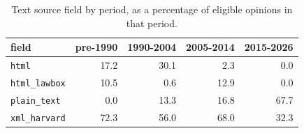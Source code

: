 \begin{table}[t]
\centering\small
\begin{tabular}{lrrrr}
\toprule
field & pre-1990 & 1990-2004 & 2005-2014 & 2015-2026  \\
\midrule
\texttt{html} & 17.2 & 30.1 & 2.3 & 0.0 \\
\texttt{html\_lawbox} & 10.5 & 0.6 & 12.9 & 0.0 \\
\texttt{plain\_text} & 0.0 & 13.3 & 16.8 & 67.7 \\
\texttt{xml\_harvard} & 72.3 & 56.0 & 68.0 & 32.3 \\
\bottomrule
\end{tabular}
\caption{Text source field by period, as a percentage of eligible opinions in that period.}
\label{tab:textsrc}
\end{table}
